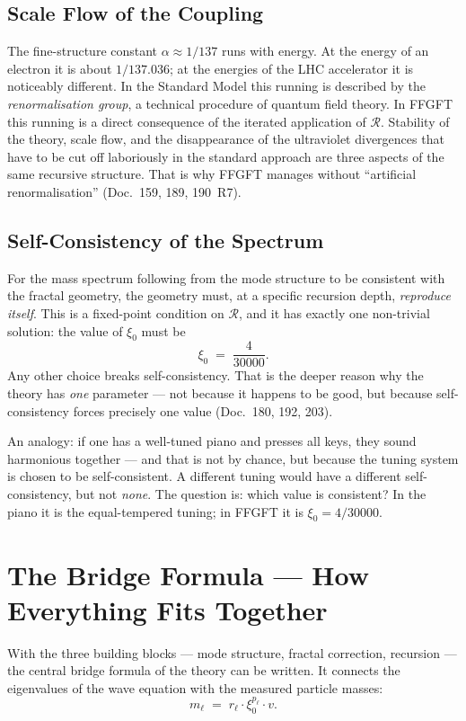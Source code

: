 \subsection*{Scale Flow of the Coupling}
The fine-structure constant $\alpha \approx 1/137$ runs with energy.
At the energy of an electron it is about $1/137{.}036$; at the
energies of the LHC accelerator it is noticeably different. In the
Standard Model this running is described by the
\emph{renormalisation group}, a technical procedure of quantum
field theory. In FFGFT this running is a direct consequence of the
iterated application of $\mathcal{R}$. Stability of the theory,
scale flow, and the disappearance of the ultraviolet divergences
that have to be cut off laboriously in the standard approach are
three aspects of the same recursive structure. That is why FFGFT
manages without \enquote{artificial renormalisation} (Doc.~159, 189,
190~R7).

\subsection*{Self-Consistency of the Spectrum}
For the mass spectrum following from the mode structure to be
consistent with the fractal geometry, the geometry must, at a
specific recursion depth, \emph{reproduce itself}. This is a
fixed-point condition on $\mathcal{R}$, and it has exactly one
non-trivial solution: the value of $\xi_0$ must be
\[
  \xi_0 \;=\; \frac{4}{30000}.
\]
Any other choice breaks self-consistency. That is the deeper reason
why the theory has \emph{one} parameter --- not because it happens
to be good, but because self-consistency forces precisely one value
(Doc.~180, 192, 203).

An analogy: if one has a well-tuned piano and presses all keys, they
sound harmonious together --- and that is not by chance, but because
the tuning system is chosen to be self-consistent. A different
tuning would have a different self-consistency, but not
\emph{none}. The question is: which value is consistent? In the
piano it is the equal-tempered tuning; in FFGFT it is
$\xi_0 = 4/30000$.

\section{The Bridge Formula --- How Everything Fits Together}

With the three building blocks --- mode structure, fractal
correction, recursion --- the central bridge formula of the theory
can be written. It connects the eigenvalues of the wave equation
with the measured particle masses:
\[
  m_\ell \;=\; r_\ell \cdot \xi_0^{p_\ell} \cdot v.
\]

